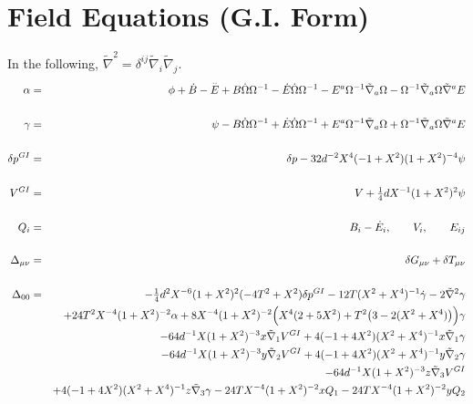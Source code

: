 \documentclass[10pt,letterpaper]{article}
\numberwithin{equation}{section}
\begin{document}
\section{Field Equations (G.I. Form)}
In the following, $\tilde{\nabla}^2 = \delta^{ij}\tilde\nabla_i\tilde\nabla_j$.
\begin{eqnarray}
\alpha &=& \phi+\dot{B} -  \overset{..}{E} + B \dot{\Omega} \Omega^{-1} -  \dot{E} \dot{\Omega} \Omega^{-1} -  E^{a} \Omega^{-1} \tilde{\nabla}_{a}\Omega -  \Omega^{-1} \tilde{\nabla}_{a}\Omega \tilde{\nabla}^{a}E
\\ \nonumber\\
\gamma &=& \psi -  B \dot{\Omega} \Omega^{-1} + \dot{E} \dot{\Omega} \Omega^{-1} + E^{a} \Omega^{-1} \tilde{\nabla}_{a}\Omega + \Omega^{-1} \tilde{\nabla}_{a}\Omega \tilde{\nabla}^{a}E
\\ \nonumber\\
\delta p^{GI} &=& \delta p - 32 d^{-2} X^4 (-1 + X^2) (1 + X^2)^{-4} \psi 
\\ \nonumber\\
V^{GI} &=& V +  \tfrac{1}{4} d X^{-1} (1 + X^2)^2 \psi
\\ \nonumber\\
Q_i &=& B_i - \dot E_i,\qquad V_i,\qquad E_{ij}
\\ \nonumber\\
\Delta_{\mu\nu} &=& \delta G_{\mu\nu} + \delta T_{\mu\nu}
\\ \nonumber\\
\Delta_{00}&=& - \tfrac{1}{4} d^2 X^{-6} (1 + X^2)^2 (-4 T^2 + X^2) \delta p^{GI}{} - 12 T (X^2 + X^4)^{-1} \dot{\gamma} - 2 \tilde{\nabla}^{2}{}\gamma \nonumber \\ 
&& + 24 T^2 X^{-4} (1 + X^2)^{-2} \alpha + 8 X^{-4} (1 + X^2)^{-2} \Bigl(X^4 (2 + 5 X^2) + T^2 \bigl(3 - 2 (X^2 + X^4)\bigr)\Bigr) \gamma \nonumber \\ 
&& - 64 d^{-1} X (1 + X^2)^{-3} x \tilde{\nabla}_{1}V^{GI}{} + 4 (-1 + 4 X^2) (X^2 + X^4)^{-1} x \tilde{\nabla}_{1}\gamma \nonumber \\ 
&& - 64 d^{-1} X (1 + X^2)^{-3} y \tilde{\nabla}_{2}V^{GI}{} + 4 (-1 + 4 X^2) (X^2 + X^4)^{-1} y \tilde{\nabla}_{2}\gamma \nonumber \\ 
&& - 64 d^{-1} X (1 + X^2)^{-3} z \tilde{\nabla}_{3}V^{GI}{} \nonumber \\ 
&& + 4 (-1 + 4 X^2) (X^2 + X^4)^{-1} z \tilde{\nabla}_{3}\gamma -24 T X^{-4} (1 + X^2)^{-2} x Q_{1} - 24 T X^{-4} (1 + X^2)^{-2} y Q_{2} \nonumber \\ 

\end{eqnarray}
\end{document}
